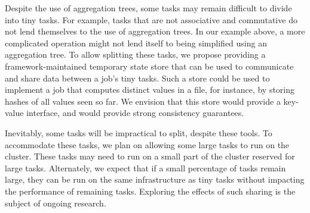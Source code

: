 Despite the use of aggregation trees, some tasks may remain difficult to
divide into tiny tasks. For example, tasks that are not associative and
commutative do not lend themselves to the use of aggregation trees. In our
example above, a more complicated operation might not lend itself to being
simplified using an aggregation tree.
To allow splitting these tasks, we propose providing a framework-maintained
temporary state store that can be used to communicate and share data between a
job's tiny tasks. Such a store could be used to implement a job that computes
distinct values in a file, for instance, by storing hashes of all values
seen so far. We envision that this store would provide a key-value interface,
and would provide strong consistency guarantees.

Inevitably, some tasks will be impractical to split, despite these tools.
To accommodate these
tasks, we plan on allowing some large tasks to run on the cluster. These tasks
may need to run on a small part of the cluster reserved for large tasks.
Alternately, we expect that if a small percentage of tasks remain large, they
can be run on the same infrastructure as tiny tasks without impacting the
performance of remaining tasks. Exploring the effects of such sharing is
the subject of ongoing research.
